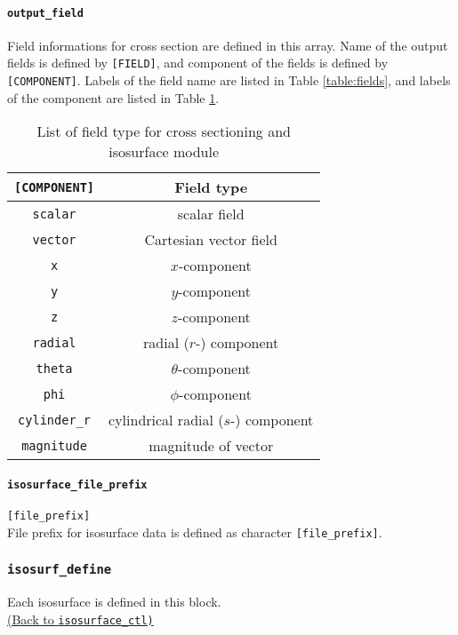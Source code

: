 %
\paragraph{\tt output\_field}
\label{href_t:psf_output_field}
Field informations for cross section are defined in this array. Name of the output fields is defined by \verb|[FIELD]|, and component of the fields is defined by \verb|[COMPONENT]|. Labels of the field name are listed in Table \ref{table:fields}, and labels of the component are listed in Table \ref{table:components}. \\
%
\begin{table}[htp]
\caption{List of field type for cross sectioning and isosurface module}
\label{table:components}
\begin{center} 
\begin{tabular}{|c|c|}
\hline
 \verb|[COMPONENT]| & Field type  \\ \hline \hline
 \verb|scalar| & scalar field  \\ \hline
 \verb|vector| & Cartesian vector field \\ \hline
 \verb|x| & $x$-component  \\ \hline
 \verb|y| & $y$-component  \\ \hline
 \verb|z| & $z$-component  \\ \hline
 \verb|radial| & radial ($r$-) component  \\ \hline
 \verb|theta| & $\theta$-component  \\ \hline
 \verb|phi| & $\phi$-component  \\ \hline
 \verb|cylinder_r| & cylindrical radial ($s$-) component  \\ \hline
 \verb|magnitude| & magnitude of vector  \\ \hline
\end{tabular}
\end{center}
\end{table}
%

%
%
\paragraph{\tt isosurface\_file\_prefix}
\label{href_t:isosurface_file_prefix}
\verb|[file_prefix]| \\
File prefix for isosurface data is defined as character \verb|[file_prefix]|.

\subsubsection{\tt isosurf\_define}
\label{href_t:isosurf_define}
Each isosurface is defined in this block. \\
\hyperref[href_i:isosurface_ctl]{(Back to {\tt isosurface\_ctl)}}

